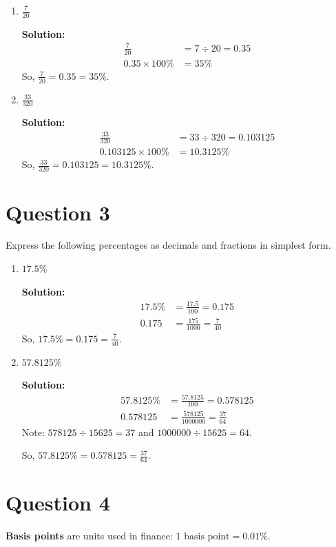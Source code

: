 \documentclass[12pt]{article}
\begin{document}
\begin{enumerate}[label=(\alph*)]
    \item \( \frac{7}{20} \)
    
    \textbf{Solution:}
    \begin{align*}
        \frac{7}{20} &= 7 \div 20 = 0.35 \\
        0.35 \times 100\% &= 35\%
    \end{align*}
    So, \( \frac{7}{20} = 0.35 = 35\% \).

    \item \( \frac{33}{320} \)
    
    \textbf{Solution:}
    \begin{align*}
        \frac{33}{320} &= 33 \div 320 = 0.103125 \\
        0.103125 \times 100\% &= 10.3125\%
    \end{align*}
    So, \( \frac{33}{320} = 0.103125 = 10.3125\% \).
\end{enumerate}

\section*{Question 3}
Express the following percentages as decimals and fractions in simplest form.

\begin{enumerate}[label=(\alph*)]
    \item \( 17.5\% \)
    
    \textbf{Solution:}
    \begin{align*}
        17.5\% &= \frac{17.5}{100} = 0.175 \\
        0.175 &= \frac{175}{1000} = \frac{7}{40}
    \end{align*}
    So, \( 17.5\% = 0.175 = \frac{7}{40} \).

    \item \( 57.8125\% \)
    
    \textbf{Solution:}
    \begin{align*}
        57.8125\% &= \frac{57.8125}{100} = 0.578125 \\
        0.578125 &= \frac{578125}{1000000} = \frac{37}{64}
    \end{align*}
    Note: \(578125 \div 15625 = 37\) and \(1000000 \div 15625 = 64\).
    
    So, \( 57.8125\% = 0.578125 = \frac{37}{64} \).
\end{enumerate}

\section*{Question 4}
\textbf{Basis points} are units used in finance: \(1 \text{ basis point} = 0.01\%\).
\end{document}
